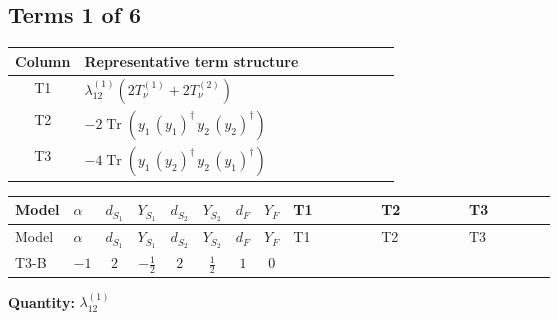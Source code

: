 \documentclass[8pt]{article}
\begin{document}
\begin{landscape}
\subsection*{Terms 1 of 6}
\begin{center}
\begin{tabular}{@{}c >{\raggedright\arraybackslash}p{0.82\linewidth}@{}}
\toprule
Column & Representative term structure \\
\midrule
T1 & \(\displaystyle {\lambda_{12}^{(1)}} (2 T_{\nu}^{(1)}+2 T_{\nu}^{(2)})\) \\
\midrule
T2 & \(\displaystyle -2 \operatorname{Tr}\!\left({y_1}\,\left({y_1}\right)^{\dagger}\,{y_2}\,\left({y_2}\right)^{\dagger}\right)\) \\
\midrule
T3 & \(\displaystyle -4 \operatorname{Tr}\!\left({y_1}\,\left({y_2}\right)^{\dagger}\,{y_2}\,\left({y_1}\right)^{\dagger}\right)\) \\
\midrule
\bottomrule
\end{tabular}
\end{center}
\smallskip
\tiny
\begin{longtable}{@{}llcccccc >{\raggedright\arraybackslash}p{0.21\linewidth} >{\raggedright\arraybackslash}p{0.21\linewidth} >{\raggedright\arraybackslash}p{0.21\linewidth}@{}}
\toprule
Model & $\alpha$ & $d_{S_1}$ & $Y_{S_1}$ & $d_{S_2}$ & $Y_{S_2}$ & $d_F$ & $Y_F$ & T1 & T2 & T3 \\
\midrule
\endfirsthead
\toprule
Model & $\alpha$ & $d_{S_1}$ & $Y_{S_1}$ & $d_{S_2}$ & $Y_{S_2}$ & $d_F$ & $Y_F$ & T1 & T2 & T3 \\
\midrule
\endhead
T3-B & $-1$ & $2$ & $-\frac{1}{2}$ & $2$ & $\frac{1}{2}$ & $1$ & $0$ & \scriptsize\adjustbox{max width=\linewidth}{$\begin{gathered} {\lambda_{12}^{(1)}} (2 T_{\nu}^{(1)}+2 T_{\nu}^{(2)})\end{gathered}$} & \scriptsize\adjustbox{max width=\linewidth}{$\begin{gathered} -2 \operatorname{Tr}\!\left({y_1}\,\left({y_1}\right)^{\dagger}\,{y_2}\,\left({y_2}\right)^{\dagger}\right)\end{gathered}$} & \scriptsize\adjustbox{max width=\linewidth}{$\begin{gathered} -4 \operatorname{Tr}\!\left({y_1}\,\left({y_2}\right)^{\dagger}\,{y_2}\,\left({y_1}\right)^{\dagger}\right)\end{gathered}$} \\
\midrule
\bottomrule
\end{longtable}
\clearpage
\noindent\textbf{Quantity: }$\lambda_{12}^{(1)}$\par\smallskip

\end{landscape}
\end{document}
